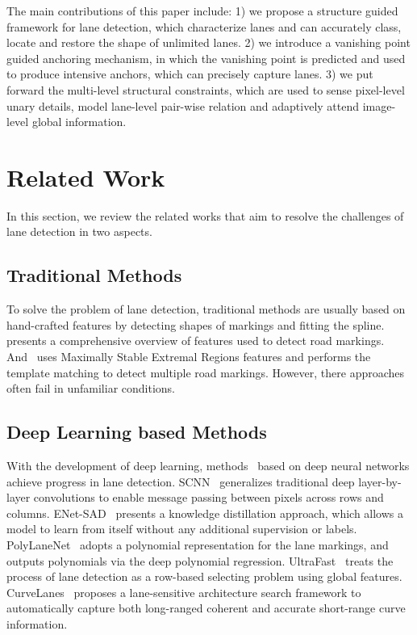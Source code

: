 \documentclass{article}
\begin{document}
The main contributions of this paper include: 1) we propose a structure guided framework for lane detection, which characterize lanes and can accurately class, locate and restore the shape of unlimited lanes. 2) we introduce a vanishing point guided anchoring mechanism, in which the vanishing point is predicted and used to produce intensive anchors, which can precisely capture lanes. 3) we put forward the multi-level structural constraints, which are used to sense pixel-level unary details, model lane-level pair-wise relation and adaptively attend image-level global information.

\section{Related Work}
In this section, we review the related works that aim to resolve the challenges of lane detection in two aspects.

\subsection{Traditional Methods}
To solve the problem of lane detection, traditional methods are usually based on hand-crafted features 
by detecting shapes of markings and fitting 
the spline. ~\cite{veit2008evaluation} presents a comprehensive overview of features used to detect road markings. And~\cite{wu2012practical} uses Maximally Stable Extremal Regions features and performs the template matching to detect multiple road markings. However, there approaches often fail in unfamiliar conditions.

\subsection{Deep Learning based Methods}
With the development of deep learning, methods~\cite{pizzati2019enhanced,van2019end,guo2020gen} based on deep neural networks achieve progress in lane detection. SCNN~\cite{pan2018spatial} generalizes traditional deep layer-by-layer convolutions to enable message passing between pixels across rows and columns.
ENet-SAD~\cite{hou2019learning} presents a knowledge distillation approach, 
which allows a model to learn from itself 
without any additional supervision or labels. PolyLaneNet~\cite{tabelini2020polylanenet} adopts a polynomial representation for the lane markings,
and outputs polynomials via the deep polynomial regression. UltraFast~\cite{qin2020ultra} treats the process of lane detection as a row-based selecting problem using global features. CurveLanes~\cite{xu2020curvelane} proposes a lane-sensitive architecture search framework to automatically capture both long-ranged coherent and accurate short-range curve information. 
\end{document}
